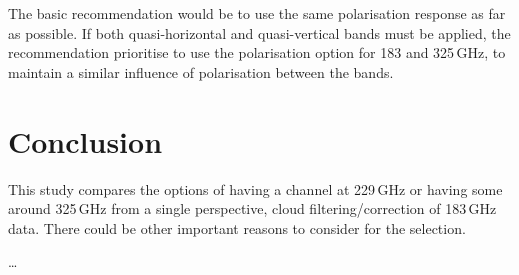 \documentclass[12pt]{article}
\begin{document}
The basic recommendation would be to use the same polarisation response as far
as possible. If both quasi-horizontal and quasi-vertical bands must be applied,
the recommendation prioritise to use the polarisation option for 183 and
325\,GHz, to maintain a similar influence of polarisation between the bands.







\section{Conclusion}
%
This study compares the options of having a channel at 229\,GHz or having some
around 325\,GHz from a single perspective, cloud filtering/correction of
183\,GHz data. There could be other important reasons to consider for the
selection.

\dots


{\footnotesize

}
\end{document}
